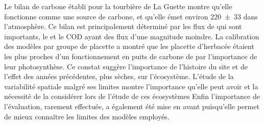 Le bilan de carbone établi pour la tourbière de La Guette montre qu'elle fonctionne comme une source de carbone, et qu'elle émet environ  \SI{220(33)}{\gcma} dans l'atmosphère.
Ce bilan est principalement déterminé par les flux de \coo qui sont importants, le \chh et le COD ayant des flux d'une magnitude moindre.
La calibration des modèles par groupe de placette a montré que les placette d'herbacée étaient les plus proches d'un fonctionnement en puits de carbone de par l'importance de leur photosynthèse.
Ce constat suggère l'importance de l'histoire du site et de l'effet des années précédentes, plus sèches, sur l'écosystème.
L'étude de la variabilité spatiale malgré ses limites montre l'importance qu'elle peut avoir et la nécessité de la considérer lors de l'étude de ces écosystèmes
Enfin l'importance de l'évaluation, rarement effectuée, a également été mise en avant puisqu'elle permet de mieux connaître les limites des modèles employés.
